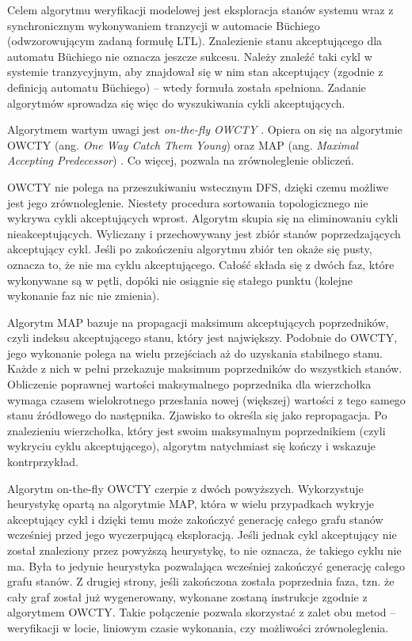 Celem algorytmu weryfikacji modelowej jest eksploracja stanów systemu wraz z synchronicznym wykonywaniem tranzycji w automacie Büchiego (odwzorowującym zadaną formułę LTL).
Znalezienie stanu akceptującego dla automatu Büchiego nie oznacza jeszcze sukcesu.
Należy znaleźć taki cykl w systemie tranzycyjnym, aby znajdował się w nim stan akceptujący (zgodnie z definicją automatu Büchiego) -- wtedy formuła została spełniona.
Zadanie algorytmów sprowadza się więc do wyszukiwania cykli akceptujących.

Algorytmem wartym uwagi jest \textit{on-the-fly OWCTY} \cite{Bar12}.
Opiera on się na algorytmie OWCTY (ang. \textit{One Way Catch Them Young}) \cite{Cer03} oraz MAP (ang. \textit{Maximal Accepting Predecessor}) \cite{Bri04}.
Co więcej, pozwala na zrównoleglenie obliczeń.

OWCTY nie polega na przeszukiwaniu wstecznym DFS, dzięki czemu możliwe jest jego zrównoleglenie.
Niestety procedura sortowania topologicznego nie wykrywa cykli akceptujących wprost.
Algorytm skupia się na eliminowaniu cykli nieakceptujących. 
Wyliczany i przechowywany jest zbiór stanów poprzedzających akceptujący cykl.
Jeśli po zakończeniu algorytmu zbiór ten okaże się pusty, oznacza to, że nie ma cyklu akceptującego.
Całość składa się z dwóch faz, które wykonywane są w pętli, dopóki nie osiągnie się stałego punktu (kolejne wykonanie faz nic nie zmienia).

Algorytm MAP bazuje na propagacji maksimum akceptujących poprzedników, czyli indeksu akceptującego stanu, który jest największy.
Podobnie do OWCTY, jego wykonanie polega na wielu przejściach aż do uzyskania stabilnego stanu.
Każde z nich w pełni przekazuje maksimum poprzedników do wszystkich stanów.
Obliczenie poprawnej wartości maksymalnego poprzednika dla wierzchołka wymaga czasem wielokrotnego przesłania nowej (większej) wartości z tego samego stanu źródłowego do następnika.
Zjawisko to określa się jako repropagacja.
Po znalezieniu wierzchołka, który jest swoim maksymalnym poprzednikiem (czyli wykryciu cyklu akceptującego), algorytm natychmiast się kończy i wskazuje kontrprzykład.

Algorytm on-the-fly OWCTY czerpie z dwóch powyższych.
Wykorzystuje heurystykę opartą na algorytmie MAP, która w wielu przypadkach wykryje akceptujący cykl i dzięki temu może zakończyć generację całego grafu stanów wcześniej przed jego wyczerpującą eksploracją.
Jeśli jednak cykl akceptujący nie został znaleziony przez powyższą heurystykę, to nie oznacza, że takiego cyklu nie ma.
Była to jedynie heurystyka pozwalająca wcześniej zakończyć generację całego grafu stanów.
Z drugiej strony, jeśli zakończona została poprzednia faza, tzn. że cały graf został już wygenerowany, wykonane zostaną instrukcje zgodnie z algorytmem OWCTY.
Takie połączenie pozwala skorzystać z zalet obu metod -- weryfikacji w locie, liniowym czasie wykonania, czy możliwości zrównoleglenia.


